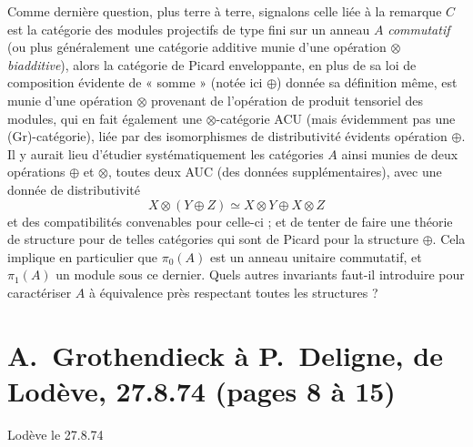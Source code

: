 \documentclass[11pt,a4paper]{article}
\begin{document}
Comme dernière question, plus terre à terre, signalons celle liée à la
remarque   \struck{\ill{}} $C$ est la
catégorie des modules projectifs de type fini sur un anneau $A$
\emph{commutatif} (ou plus généralement une catégorie additive munie d'une
opération $\otimes$ \struck{\ill{}}  \emph{biadditive}), alors la
catégorie de Picard enveloppante, en plus de sa loi de composition évidente
de « somme » (notée ici $\oplus$) donnée \struck{\ill{}}  sa
définition même, est munie d'une opération $\otimes$ provenant de
l'opération de produit tensoriel  des modules, qui en fait
également une $\otimes$-catégorie ACU (mais évidemment pas une
(Gr)-catégorie), liée par des isomorphismes de distributivité évidents
 opération $\oplus$. Il y aurait lieu d'étudier
systématiquement les catégories $A$ ainsi munies de deux opérations $\oplus$
et $\otimes$, toutes deux AUC (des données supplémentaires), avec une donnée
de distributivité
\[ X \otimes (Y \oplus Z) \simeq X \otimes Y \oplus X \otimes Z \]
et des compatibilités convenables pour celle-ci ; et de tenter de faire une
théorie de structure pour de telles catégories qui sont de Picard pour la
structure $\oplus$. Cela implique en particulier que $\pi_0(A)$ est un
anneau unitaire commutatif, et $\pi_1(A)$ un module sous ce dernier. Quels
autres invariants faut-il introduire pour caractériser $A$ à équivalence
près respectant toutes les structures ?

\section*{A.\ Grothendieck à P.\ Deligne, de Lodève, 27.8.74 (pages 8 à 15)}




Lodève le 27.8.74
\end{document}

